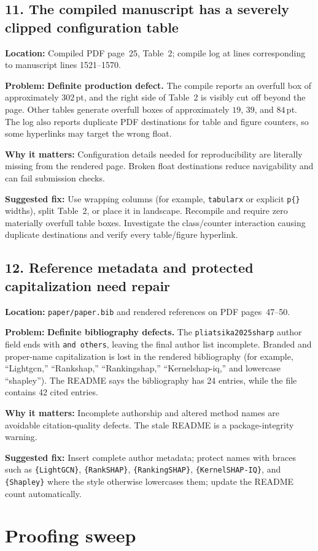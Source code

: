 \documentclass[11pt]{article}
\newcommand{\loc}[1]{\par\noindent\textbf{Location:} #1\par}
\newcommand{\problem}[1]{\noindent\textbf{Problem:} #1\par}
\newcommand{\impact}[1]{\noindent\textbf{Why it matters:} #1\par}
\newcommand{\fix}[1]{\noindent\textbf{Suggested fix:} #1\par}
\begin{document}
\subsection*{11. The compiled manuscript has a severely clipped configuration table}

\loc{Compiled PDF page~25, Table~2; compile log at lines corresponding to manuscript lines 1521--1570.}
\problem{\textbf{Definite production defect.} The compile reports an overfull box of approximately $302$\,pt, and the right side of Table~2 is visibly cut off beyond the page.  Other tables generate overfull boxes of approximately $19$, $39$, and $84$\,pt.  The log also reports duplicate PDF destinations for table and figure counters, so some hyperlinks may target the wrong float.}
\impact{Configuration details needed for reproducibility are literally missing from the rendered page.  Broken float destinations reduce navigability and can fail submission checks.}
\fix{Use wrapping columns (for example, \texttt{tabularx} or explicit \texttt{p\{\}} widths), split Table~2, or place it in landscape.  Recompile and require zero materially overfull table boxes.  Investigate the class/counter interaction causing duplicate destinations and verify every table/figure hyperlink.}

\subsection*{12. Reference metadata and protected capitalization need repair}

\loc{\texttt{paper/paper.bib} and rendered references on PDF pages~47--50.}
\problem{\textbf{Definite bibliography defects.} The \texttt{pliatsika2025sharp} author field ends with \texttt{and others}, leaving the final author list incomplete.  Branded and proper-name capitalization is lost in the rendered bibliography (for example, ``Lightgcn,'' ``Rankshap,'' ``Rankingshap,'' ``Kernelshap-iq,'' and lowercase ``shapley'').  The README says the bibliography has 24 entries, while the file contains 42 cited entries.}
\impact{Incomplete authorship and altered method names are avoidable citation-quality defects.  The stale README is a package-integrity warning.}
\fix{Insert complete author metadata; protect names with braces such as \texttt{\{LightGCN\}}, \texttt{\{RankSHAP\}}, \texttt{\{RankingSHAP\}}, \texttt{\{KernelSHAP-IQ\}}, and \texttt{\{Shapley\}} where the style otherwise lowercases them; update the README count automatically.}

\section*{Proofing sweep}
\end{document}
